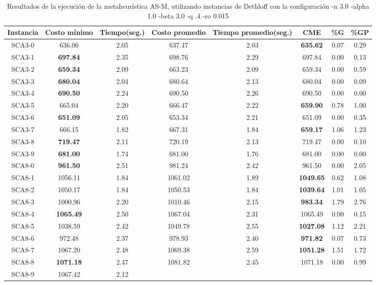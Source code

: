 \begin{table}[h]
\caption{Resultados de la ejecución de la metaheurística AS-M, utilizando instancias de Dethloff con la configuración -n 3.0 -alpha 1.0 -beta 3.0 -q .4 -ro 0.015}
\centering
\small
\begin{tabular}{c c c c c c c c}
\hline\hline
Instancia & Costo mínimo & Tiempo(seg.) & Costo promedio & Tiempo promedio(seg.) & CME & \%G & \%GP \\ [0.5ex]
\hline
SCA3-0 & 636.06 & 2.05 & 
637.47 & 2.03 & \bf{635.62} & 
0.07 & 0.29\\SCA3-1 & \bf{697.84} & 2.35 & 
698.76 & 2.29 & 697.84 & 0.00
 & 0.13\\SCA3-2 & \bf{659.34} & 2.09 & 
663.23 & 2.09 & 659.34 & 0.00
 & 0.59\\SCA3-3 & \bf{680.04} & 2.04 & 
680.64 & 2.13 & 680.04 & 0.00
 & 0.09\\SCA3-4 & \bf{690.50} & 2.24 & 
690.50 & 2.26 & 690.50 & 0.00
 & 0.00\\
SCA3-5 & 665.04 & 2.20 & 
666.47 & 2.22 & \bf{659.90} & 
0.78 & 1.00\\SCA3-6 & \bf{651.09} & 2.05 & 
653.34 & 2.21 & 651.09 & 0.00
 & 0.35\\SCA3-7 & 666.15 & 1.82 & 
667.31 & 1.84 & \bf{659.17} & 
1.06 & 1.23\\SCA3-8 & \bf{719.47} & 2.11 & 
720.19 & 2.13 & 719.47 & 0.00
 & 0.10\\SCA3-9 & \bf{681.00} & 1.74 & 
681.00 & 1.76 & 681.00 & 0.00
 & 0.00\\
SCA8-0 & \bf{961.50} & 2.51 & 
981.24 & 2.42 & 961.50 & 0.00
 & 2.05\\SCA8-1 & 1056.11 & 1.84 & 
1061.02 & 1.89 & \bf{1049.65} & 
0.62 & 1.08\\SCA8-2 & 1050.17 & 1.84 & 
1050.53 & 1.84 & \bf{1039.64} & 
1.01 & 1.05\\SCA8-3 & 1000.96 & 2.20 & 
1010.46 & 2.15 & \bf{983.34} & 
1.79 & 2.76\\SCA8-4 & \bf{1065.49} & 2.50 & 
1067.04 & 2.31 & 1065.49 & 0.00
 & 0.15\\SCA8-5 & 1038.59 & 2.42 & 
1049.78 & 2.55 & \bf{1027.08} & 
1.12 & 2.21\\SCA8-6 & 972.48 & 2.37 & 
978.93 & 2.40 & \bf{971.82} & 
0.07 & 0.73\\SCA8-7 & 1067.20 & 2.48 & 
1069.38 & 2.59 & \bf{1051.28} & 
1.51 & 1.72\\SCA8-8 & \bf{1071.18} & 2.47 & 
1081.82 & 2.45 & 1071.18 & 0.00
 & 0.99\\SCA8-9 & 1067.42 & 2.12 & 

\end{tabular}
\end{table}
